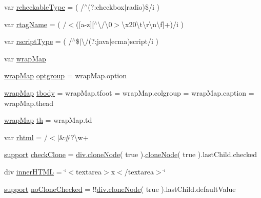 \begin{DoxyCompactItemize}
var \hyperlink{jquery-3_82_81_8js_a06840c5c22346e69ae2d82bd571a40f3}{rcheckable\+Type} = ( /$^\wedge$(?\+:checkbox$\vert$radio)\$/i )
\item 
var \hyperlink{jquery-3_82_81_8js_a572bc9f0626d64ea72b4577c2427b2e2}{rtag\+Name} = ( /$<$(\mbox{[}a-\/z\mbox{]}\mbox{[}$^\wedge$\textbackslash{}/\textbackslash{}0$>$\textbackslash{}x20\textbackslash{}t\textbackslash{}r\textbackslash{}n\textbackslash{}f\mbox{]}+)/i )
\item 
var \hyperlink{jquery-3_82_81_8js_afe9e6e5fe3b5bee3de77fe4004b99f8c}{rscript\+Type} = ( /$^\wedge$\$$\vert$\textbackslash{}/(?\+:java$\vert$ecma)script/i )
\item 
var \hyperlink{jquery-3_82_81_8js_af3142e3869e11d67d095efb9473f2fcf}{wrap\+Map}
\item 
\hyperlink{jquery-3_82_81_8js_af3142e3869e11d67d095efb9473f2fcf}{wrap\+Map} \hyperlink{jquery-3_82_81_8js_a1ced74d0afd452ea5a68784588a4538a}{optgroup} = wrap\+Map.\+option
\item 
\hyperlink{jquery-3_82_81_8js_af3142e3869e11d67d095efb9473f2fcf}{wrap\+Map} \hyperlink{jquery-3_82_81_8js_ae7180a004e8ddc434ea857b499b3256d}{tbody} = wrap\+Map.\+tfoot = wrap\+Map.\+colgroup = wrap\+Map.\+caption = wrap\+Map.\+thead
\item 
\hyperlink{jquery-3_82_81_8js_af3142e3869e11d67d095efb9473f2fcf}{wrap\+Map} \hyperlink{jquery-3_82_81_8js_a2bc51c85bb51dfec37c757866128bced}{th} = wrap\+Map.\+td
\item 
var \hyperlink{jquery-3_82_81_8js_ae20d94ff246af97bd982fd3258a6618c}{rhtml} = /$<$$\vert$\&\#?\textbackslash{}w+
\item 
\hyperlink{jquery-3_82_81_8js_ab166c89ccabddfd7c423a7fcb23ca84f}{support} \hyperlink{jquery-3_82_81_8js_aa8a4f169b5bc9da55242455f9feb6bb0}{check\+Clone} = \hyperlink{jquery-3_82_81_8js_a425684b52fb76a109f25625d7327418b}{div.\+clone\+Node}( true ).\hyperlink{jquery-3_82_81_8js_a425684b52fb76a109f25625d7327418b}{clone\+Node}( true ).last\+Child.\+checked
\item 
div \hyperlink{jquery-3_82_81_8js_a564850686c11d3be602dccef4aee9b96}{inner\+H\+T\+ML} = \char`\"{}$<$textarea$>$x$<$/textarea$>$\char`\"{}
\item 
\hyperlink{jquery-3_82_81_8js_ab166c89ccabddfd7c423a7fcb23ca84f}{support} \hyperlink{jquery-3_82_81_8js_a46174f6d68b2524637fd67185b97f33a}{no\+Clone\+Checked} = !!\hyperlink{jquery-3_82_81_8js_a425684b52fb76a109f25625d7327418b}{div.\+clone\+Node}( true ).last\+Child.\+default\+Value
\item 
$$
\end{DoxyCompactItemize}

